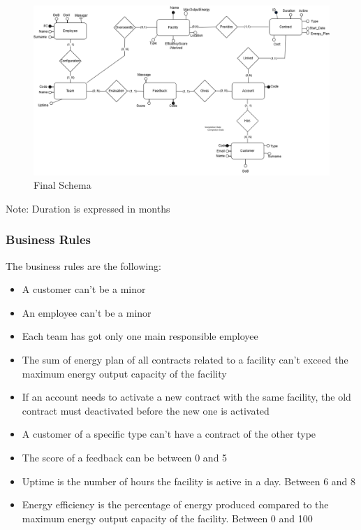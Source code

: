 \begin{figure}[H]
    \centering
    \includegraphics[width=\textwidth]{images/ER.png}
    \caption{Final Schema}
\end{figure}

\noindent Note: Duration is expressed in months

\subsubsection{Business Rules}
The business rules are the following:
\begin{itemize}
    \item A customer can't be a minor
    \item An employee can't be a minor
    \item Each team has got only one main responsible employee
    \item The sum of energy plan of all contracts related to a facility can't exceed the maximum energy output capacity of the facility
    \item If an account needs to activate a new contract with the same facility, the old contract must deactivated before the new one is activated
    \item A customer of a specific type can't have a contract of the other type
    \item The score of a feedback can be between 0 and 5
    \item Uptime is the number of hours the facility is active in a day. Between 6 and 8
    \item Energy efficiency is the percentage of energy produced compared to the maximum energy output capacity of the facility. Between 0 and 100
\end{itemize}



